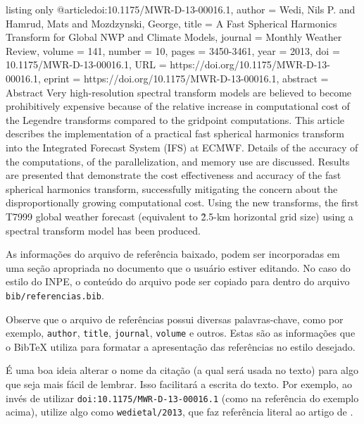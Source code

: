 \begin{texexp}{listing only}
@article{doi:10.1175/MWR-D-13-00016.1,
author   = {Wedi, Nils P. and Hamrud, Mats and Mozdzynski, George},
title    = {A Fast Spherical Harmonics Transform for Global NWP
            and Climate Models},
journal  = {Monthly Weather Review},
volume   = {141},
number   = {10},
pages    = {3450-3461},
year     = {2013},
doi      = {10.1175/MWR-D-13-00016.1},
URL      = {https://doi.org/10.1175/MWR-D-13-00016.1},
eprint   = {https://doi.org/10.1175/MWR-D-13-00016.1},
abstract = {Abstract Very high-resolution spectral transform models
            are believed to become prohibitively expensive because of
            the relative increase in computational cost of the 
            Legendre transforms compared to the gridpoint computations.
            This article describes the implementation of a practical
            fast spherical harmonics transform into the Integrated
            Forecast System (IFS) at ECMWF. Details of the accuracy
            of the computations, of the parallelization, and memory
            use are discussed. Results are presented that demonstrate
            the cost effectiveness and accuracy of the fast spherical
            harmonics transform, successfully mitigating the concern
            about the disproportionally growing computational cost.
            Using the new transforms, the first T7999 global weather
            forecast (equivalent to \~2.5-km horizontal grid size)
            using a spectral transform model has been produced.}
}
\end{texexp}

As informações do arquivo de referência baixado, podem ser incorporadas em uma seção apropriada no documento que o usuário estiver editando. No caso do estilo do INPE, o conteúdo do arquivo pode ser copiado para dentro do arquivo {\tt bib/referencias.bib}.

Observe que o arquivo de referências possui diversas palavras-chave, como por exemplo, {\tt author}, {\tt title}, {\tt journal}, {\tt volume} e outros. Estas são as informações que o Bib\TeX{} utiliza para formatar a apresentação das referências no estilo desejado.

\begin{marker}
  É uma boa ideia alterar o nome da citação (a qual será usada no texto) para algo que seja mais fácil de lembrar. Isso facilitará a escrita do texto. Por exemplo, ao invés de utilizar {\tt doi:10.1175/MWR-D-13-00016.1} (como na referência do exemplo acima), utilize algo como {\tt wedietal/2013}, que faz referência literal ao artigo de .
\end{marker}


